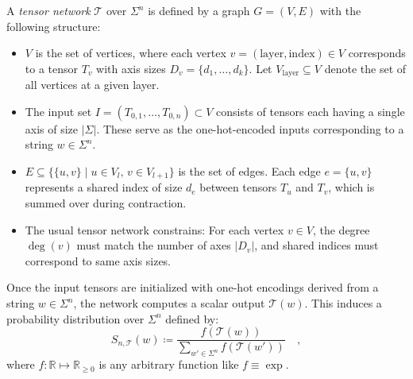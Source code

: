 \documentclass[../../main.tex]{subfiles}
\begin{document}
    \begin{definition}
    A \emph{tensor network} \( \mathcal{T} \) over \( \Sigma^n \) is defined by a graph \( G = (V, E) \) with the following structure:
    \begin{itemize}
        \item \( V \) is the set of vertices, where each vertex \( v = (\text{layer}, \text{index}) \in V \) corresponds to a tensor \( T_v \) with axis sizes \( D_v = \{d_1, \dots, d_k\} \). Let \( V_{\text{layer}} \subseteq V \) denote the set of all vertices at a given layer.
        
        \item The input set \( I = (T_{0,1}, \dots, T_{0,n}) \subset V \) consists of tensors each having a single axis of size \( |\Sigma| \). These serve as the one-hot-encoded inputs corresponding to a string \( w \in \Sigma^n \).
        
        \item \( E \subseteq \{\{u, v\} \mid u \in V_l,\, v \in V_{l+1}\} \) is the set of edges. Each edge \( e = \{u, v\} \) represents a shared index of size \( d_e \) between tensors \( T_u \) and \( T_v \), which is summed over during contraction.
        
        \item The usual tensor network constrains: For each vertex \( v \in V \), the degree \( \deg(v) \) must match the number of axes \( |D_v| \), and shared indices must correspond to same axis sizes.
    \end{itemize}

    Once the input tensors are initialized with one-hot encodings derived from a string \( w \in \Sigma^n \), the network computes a scalar output \( \mathcal{T}(w) \). This induces a probability distribution over \( \Sigma^n \) defined by:
    \[
    S_{n, \mathcal{T}}(w) \coloneqq \frac{f(\mathcal{T}(w))}{\sum_{w' \in \Sigma^n} f(\mathcal{T}(w'))} \quad ,
    \]
    where $f: \mathbb{R} \mapsto \mathbb{R}_{\geq 0}$ is any arbitrary function like $f \equiv \exp$.
    \end{definition}
\end{document}

